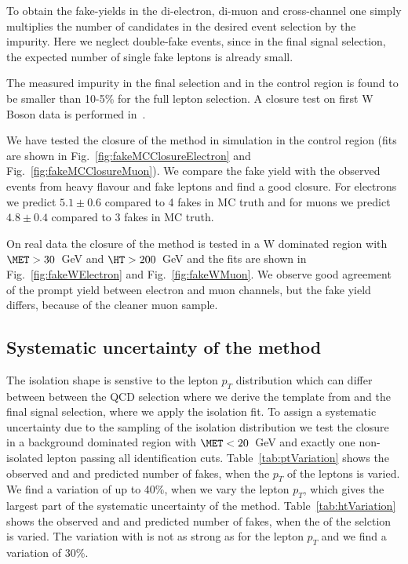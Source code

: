 To obtain the fake-yields in the di-electron, di-muon and cross-channel one simply
multiplies the number of candidates in the desired event selection by the impurity.
Here we neglect double-fake events, since in the final signal selection, the expected number of single
fake leptons is already small.

The measured impurity in the final selection and in the control region is found to be smaller than 10-5\%
for the full lepton selection. A closure test on first W Boson data is performed in~\cite{suspas10001}.

We have tested the closure of the method in simulation in the control region 
(fits are shown in Fig.~\ref{fig:fakeMCClosureElectron} and Fig.~\ref{fig:fakeMCClosureMuon}). 
We compare the fake yield with the observed events from 
heavy flavour and fake leptons and find a good closure.
For electrons we predict $5.1\pm0.6$ compared to 4 fakes in MC truth
and for muons we predict $4.8\pm0.4$ compared to 3 fakes in MC truth.

On real data the closure of the method is tested in a W dominated region with
$\MET > 30$~GeV and $\HT>200$~GeV and the fits are shown in
Fig.~\ref{fig:fakeWElectron} and Fig.~\ref{fig:fakeWMuon}.
We observe good agreement of the prompt yield between electron 
and muon channels, but the fake yield differs, because of the
cleaner muon sample.

\subsection{Systematic uncertainty of the method}

The isolation shape is senstive to the lepton $p_T$ distribution which can differ between
between the QCD selection where we derive the template from and the final signal
selection, where we apply the isolation fit.
To assign a systematic uncertainty due to the sampling of the isolation distribution
we test the closure in a background dominated region with $\MET < 20$~GeV and exactly one 
non-isolated lepton passing all identification cuts. Table~\ref{tab:ptVariation} shows the observed
and and predicted number of fakes, when the $p_T$ of the leptons is varied.
We find a variation of up to 40\%, when we vary the lepton $p_T$, which gives the largest
part of the systematic uncertainty of the method.
Table~\ref{tab:htVariation} shows the observed
and and predicted number of fakes, when the \HT of the selction is varied.
The variation with \HT is not as strong as for the lepton $p_T$ and we find a variation of 30\%.

